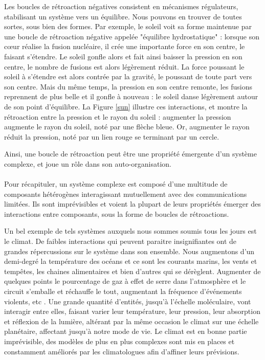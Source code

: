 		Les boucles de rétroaction négatives consistent en mécanismes régulateurs, stabilisant un système vers un équilibre. Nous pouvons en trouver de toutes sortes, sous bien des formes. Par exemple, le soleil voit sa forme maintenue par une boucle de rétroaction négative appelée "équilibre hydrostatique" \cite{haubold_analytic_1992} : lorsque son cœur réalise la fusion nucléaire, il crée une importante force en son centre, le faisant s'étendre. Le soleil gonfle alors et fait ainsi baisser la pression en son centre, le nombre de fusions est alors légèrement réduit. La force poussant le soleil à s'étendre est alors contrée par la gravité, le poussant de toute part vers son centre. Mais du même temps, la pression en son centre remonte, les fusions reprennent de plus belle et il gonfle à nouveau : le soleil danse légèrement autour de son point d'équilibre. La Figure \ref{sun} illustre ces interactions, et montre la rétroaction entre la pression et le rayon du soleil : augmenter la pression augmente le rayon du soleil, noté par une flèche bleue. Or, augmenter le rayon réduit la pression, noté par un lien rouge se terminant par un cercle.
		
		Ainsi, une boucle de rétroaction peut être une propriété émergente d'un système complexe, et joue un rôle dans son auto-organisation.
			
			\paragraph{}
			Pour récapituler, un système complexe est composé d'une multitude de composants hétérogènes interagissant mutuellement avec des communications limitées. Ils sont imprévisibles et voient la plupart de leurs propriétés émerger des interactions entre composants, sous la forme de boucles de rétroactions.
			
			Un bel exemple de tels systèmes auxquels nous sommes soumis tous les jours est le climat. De faibles interactions qui peuvent paraitre insignifiantes ont de grandes répercussions sur le système dans son ensemble. Nous augmentons d'un demi-degré la température des océans et ce sont les courants marins, les vents et tempêtes, les chaines alimentaires et bien d'autres qui se dérèglent. Augmenter de quelques points le pourcentage de gaz à effet de serre dans l'atmosphère et le circuit s'emballe et réchauffe le tout, augmentant la fréquence d'événements violents, etc \cite{allen_2018_2018}. Une grande quantité d'entités, jusqu'à l'échelle moléculaire, vont interagir entre elles, faisant varier leur température, leur pression, leur absorption et réflexion de la lumière, altérant par la même occasion le climat sur une échelle planétaire, affectant jusqu'à notre mode de vie. Le climat est en bonne partie imprévisible, des modèles de plus en plus complexes sont mis en places et constamment améliorés par les climatologues afin d'affiner leurs prévisions.
				
